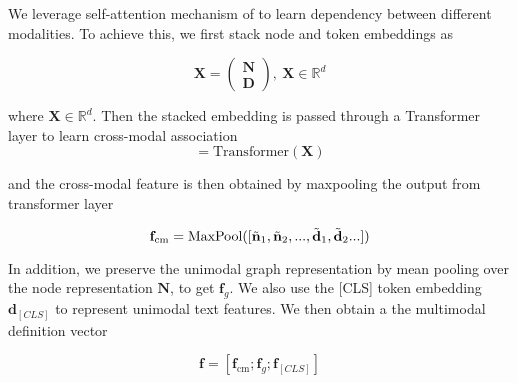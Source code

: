 

We leverage self-attention mechanism of \cite{transformer} to learn dependency between different modalities. To achieve this, we first stack node and token embeddings as

\begin{equation}
\mathbf{X}=\begin{pmatrix}
\mathbf{N} \\
\mathbf{D}
\end{pmatrix}, \ \mathbf{X}\in\mathbb{R}^d
\end{equation}

\noindent where $\mathbf{X}\in\mathbb{R}^d$. Then the stacked embedding is passed through a Transformer layer to learn cross-modal association
\begin{equation}
[ \Tilde{\mathbf{n}}_1, \Tilde{\mathbf{n}}_2, ..., \Tilde{\mathbf{d}}_1, \Tilde{\mathbf{d}}_2...]=\text{Transformer}(\mathbf{X})\end{equation}





\noindent and the cross-modal feature is then obtained by maxpooling the output from transformer layer

\begin{equation}
    \mathbf{f}_\text{cm}=\text{MaxPool}([ \Tilde{\mathbf{n}}_1, \Tilde{\mathbf{n}}_2, ..., \Tilde{\mathbf{d}}_1, \Tilde{\mathbf{d}}_2...])
\end{equation}


In addition, we preserve the unimodal graph representation by mean pooling over the node representation $\mathbf{N}$, to get $\mathbf{f}_{g}$. We also use the [CLS] token embedding $\mathbf{d}_{[CLS]}$ to represent unimodal text features. We then obtain a the multimodal definition vector

\begin{equation}
    \mathbf{f}=[\mathbf{f}_\text{cm};\mathbf{f}_{g};\mathbf{f}_{[CLS]}]
\end{equation}
